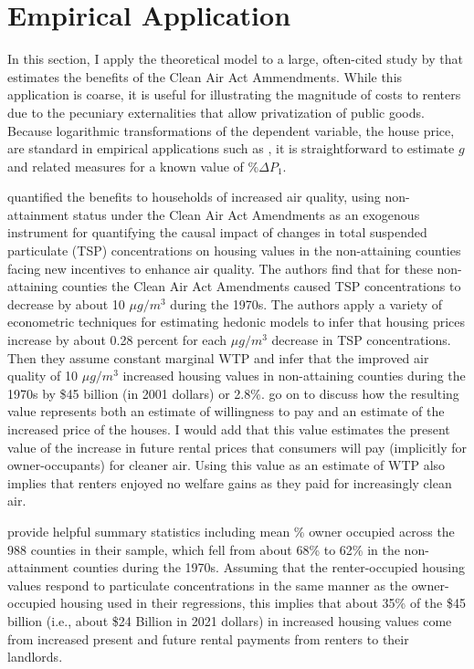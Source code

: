 \documentclass[ecta,nameyear,draft]{econsocart}
\theoremstyle{plain}
\theoremstyle{remark}
\begin{document}
 
\section{Empirical Application}
In this section, I apply the theoretical model to a large, often-cited study by \cite{chaygreenstone05} that estimates the benefits of the Clean Air Act Ammendments. While this application is coarse, it is useful for illustrating the magnitude of costs to renters due to the pecuniary externalities that allow privatization of public goods.  Because logarithmic transformations of the dependent variable, the house price, are standard in empirical applications such as \cite{chaygreenstone05}, it is straightforward to estimate $g$ and related measures for a known value of $\%\Delta P_1 $. 

\cite{chaygreenstone05} quantified the benefits to households of increased air quality, using non-attainment status under the Clean Air Act Amendments as an exogenous instrument for quantifying the causal impact of changes in total suspended particulate (TSP) concentrations on housing values in the non-attaining counties facing new incentives to enhance air quality. The authors find that for these non-attaining counties the Clean Air Act Amendments caused TSP concentrations to decrease by about 10 $\mu g/m^3$ during the 1970s. The authors apply a variety of econometric techniques for estimating hedonic models to infer that housing prices increase by about 0.28 percent for each $\mu g/m^3$ decrease in TSP concentrations. Then they assume constant marginal WTP and infer that the improved air quality of 10 $\mu g/m^3$ increased housing values in non-attaining counties during the 1970s by \$45 billion (in 2001 dollars) or 2.8\%. \cite{chaygreenstone05} go on to discuss how the resulting value represents both an estimate of willingness to pay and an estimate of the increased price of the houses. I would add that this value estimates the present value of the increase in future rental prices that consumers will pay (implicitly for owner-occupants) for cleaner air. Using this value as an estimate of WTP also implies that renters enjoyed no welfare gains as they paid for increasingly clean air.

\cite{chaygreenstone05} provide helpful summary statistics including mean \% owner occupied across the 988 counties in their sample, which fell from about 68\% to 62\% in the non-attainment counties during the 1970s. Assuming that the renter-occupied housing values respond to particulate concentrations in the same manner as the owner-occupied housing used in their regressions, this implies that about 35\% of the \$45 billion (i.e., about \$24 Billion in 2021 dollars) in increased housing values come from increased present and future rental payments from renters to their landlords. 
\end{document}
